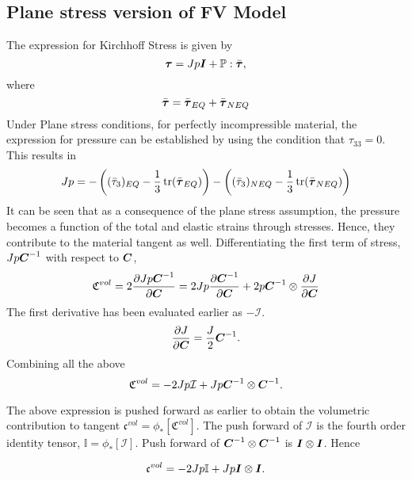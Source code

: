 \documentclass[11pt,twoside,TimesRoman]{article}
\newcommand{\parder}[2]{{\dfrac{\partial #1}{\partial #2}}}
\begin{document}
\subsection{Plane stress version of FV Model}
The expression for Kirchhoff Stress is given by
\begin{equation}
\mbox{\boldmath $\tau$} = Jp\mbox{\boldmath $I$} + \mathbb{P}:\bar{\mbox{\boldmath $\tau$}},
\end{equation}
where
\begin{equation}
\bar{\mbox{\boldmath $\tau$}} = \bar{\mbox{\boldmath $\tau$}}_{EQ} + \bar{\mbox{\boldmath $\tau$}}_{NEQ}
\end{equation}
Under Plane stress conditions, for perfectly incompressible material, the expression for pressure can be established by using the condition that $\tau_{33}=0$. This results in
\begin{equation}
Jp = -\left((\bar{\tau}_{3})_{EQ}-\frac{1}{3}\operatorname{tr}(\bar{\mbox{\boldmath $\tau$}}_{EQ}) \right)-\left((\bar{\tau}_{3})_{NEQ}-\frac{1}{3}\operatorname{tr}(\bar{\mbox{\boldmath $\tau$}}_{NEQ}) \right)
\label{FV:pressureevaluation}
\end{equation}
It can be seen that as a consequence of the plane stress assumption, the pressure becomes a function of the total and elastic strains through stresses. Hence, they contribute to the material tangent as well. Differentiating the first term of stress, $Jp{\mbox{\boldmath $C$}}^{-1}$ with respect to $\mbox{\boldmath $C$}$,
\begin{equation}
	\mathfrak{C}^{vol} =2\parder{Jp\bfCinv}{\bfC} = 2Jp \parder{\bfCinv}{\bfC} + 2p \bfCinv \otimes \parder{J}{\bfC}
\end{equation}
The first derivative has been evaluated earlier as $ -\mathcal{I}$. 
\begin{equation}
\parder{J}{\bfC}  = \frac{J}{2}\bfCinv.
\end{equation}
Combining all the above
\begin{equation}
	\mathfrak{C}^{vol} = -2Jp\mathcal{I} + Jp{\mbox{\boldmath $C$}}^{-1}  \otimes {\mbox{\boldmath $C$}}^{-1}.
\end{equation}


The above expression is pushed forward as earlier to obtain the volumetric contribution to tangent $\mathfrak{c}^{vol} = \phi_* \left[\mathfrak{C}^{vol} \right]$. The push forward of $\mathcal{I}$ is the fourth order identity tensor, $\mathbb{I} = \phi_* \left[\mathcal{I} \right]$. Push forward of ${\mbox{\boldmath $C$}}^{-1} \otimes {\mbox{\boldmath $C$}}^{-1}$ is $\mbox{\boldmath $I$} \otimes \mbox{\boldmath $I$}$. Hence

\begin{equation}
	\mathfrak{c}^{vol} = -2Jp\mathbb{I} + Jp\mbox{\boldmath $I$} \otimes \mbox{\boldmath $I$}.
\end{equation}
\end{document}
